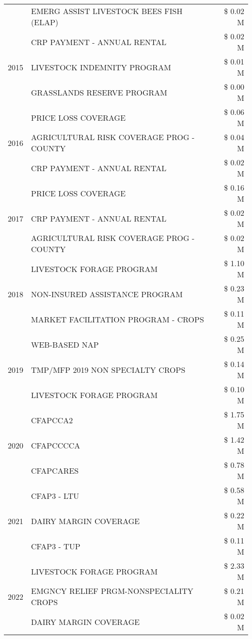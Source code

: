 \begin{tabular}{llr}
 & EMERG ASSIST LIVESTOCK BEES FISH (ELAP) & \$ 0.02 M \\
\cline{1-3}
\multirow[t]{3}{*}{2015} & CRP PAYMENT - ANNUAL RENTAL & \$ 0.02 M \\
 & LIVESTOCK INDEMNITY PROGRAM & \$ 0.01 M \\
 & GRASSLANDS RESERVE PROGRAM & \$ 0.00 M \\
\cline{1-3}
\multirow[t]{3}{*}{2016} & PRICE LOSS COVERAGE & \$ 0.06 M \\
 & AGRICULTURAL RISK COVERAGE PROG - COUNTY & \$ 0.04 M \\
 & CRP PAYMENT - ANNUAL RENTAL & \$ 0.02 M \\
\cline{1-3}
\multirow[t]{3}{*}{2017} & PRICE LOSS COVERAGE & \$ 0.16 M \\
 & CRP PAYMENT - ANNUAL RENTAL & \$ 0.02 M \\
 & AGRICULTURAL RISK COVERAGE PROG - COUNTY & \$ 0.02 M \\
\cline{1-3}
\multirow[t]{3}{*}{2018} & LIVESTOCK FORAGE PROGRAM & \$ 1.10 M \\
 & NON-INSURED ASSISTANCE PROGRAM & \$ 0.23 M \\
 & MARKET FACILITATION PROGRAM - CROPS & \$ 0.11 M \\
\cline{1-3}
\multirow[t]{3}{*}{2019} & WEB-BASED NAP & \$ 0.25 M \\
 & TMP/MFP 2019 NON SPECIALTY CROPS & \$ 0.14 M \\
 & LIVESTOCK FORAGE PROGRAM & \$ 0.10 M \\
\cline{1-3}
\multirow[t]{3}{*}{2020} & CFAPCCA2 & \$ 1.75 M \\
 & CFAPCCCCA & \$ 1.42 M \\
 & CFAPCARES & \$ 0.78 M \\
\cline{1-3}
\multirow[t]{3}{*}{2021} & CFAP3 - LTU & \$ 0.58 M \\
 & DAIRY MARGIN COVERAGE & \$ 0.22 M \\
 & CFAP3 - TUP & \$ 0.11 M \\
\cline{1-3}
\multirow[t]{3}{*}{2022} & LIVESTOCK FORAGE PROGRAM & \$ 2.33 M \\
 & EMGNCY RELIEF PRGM-NONSPECIALITY CROPS & \$ 0.21 M \\
 & DAIRY MARGIN COVERAGE & \$ 0.02 M \\
\cline{1-3}
\bottomrule
\end{tabular}
